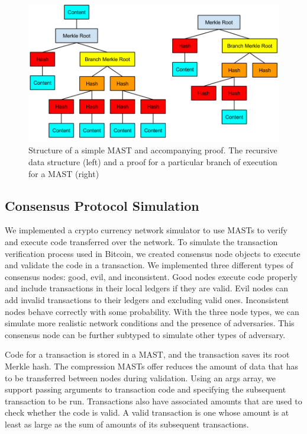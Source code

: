 \documentclass{vldb}
\begin{document}
\begin{figure}[h]
	\includegraphics[scale=.35]{mast}
	\caption{Structure of a simple MAST and accompanying proof. The recursive data structure (left) and a proof for a particular branch of execution for a MAST (right)}
	\label{system}
\end{figure}

\subsection{Consensus Protocol Simulation}

We implemented a crypto currency network simulator to use MASTs to verify and
execute code transferred over the network. To simulate the transaction
verification process used in Bitcoin, we created consensus node objects to execute and
validate the code in a transaction. We implemented three different types of
consensus nodes: good, evil, and inconsistent. Good nodes execute
code properly and include transactions in their local ledgers if they are
valid. Evil nodes can add invalid transactions to their ledgers
and excluding valid ones. Inconsistent nodes behave correctly with some
probability. With the three node types, we can simulate more realistic network
conditions and the presence of adversaries. This consensus node can be further
subtyped to simulate other types of adversary.

Code for a transaction is stored in a MAST, and the transaction saves its root
Merkle hash. The compression MASTs offer reduces the amount of data that has to
be transferred between nodes during validation. Using an args array, we support
passing arguments to transaction code and specifying the subsequent transaction
to be run. Transactions also have associated amounts that are used to check
whether the code is valid. A valid transaction is one whose amount is at least
as large as the sum of amounts of its subsequent transactions.
\end{document}
